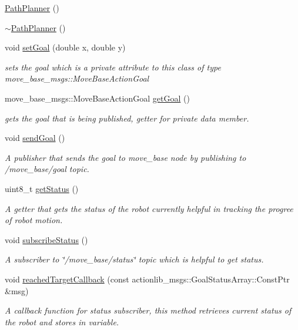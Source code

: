 \begin{DoxyCompactItemize}
\item 
\hyperlink{classPathPlanner_a376f30d795cfe0a40f8923f49336f7da}{Path\+Planner} ()
\item 
\hyperlink{classPathPlanner_a61bd61f848e519df56b75eddd3732ab8}{$\sim$\+Path\+Planner} ()
\item 
void \hyperlink{classPathPlanner_a3143ffa68678f4f30917565c339802dc}{set\+Goal} (double x, double y)
\begin{DoxyCompactList}\small\item\em sets the goal which is a private attribute to this class of type move\+\_\+base\+\_\+msgs\+::\+Move\+Base\+Action\+Goal \end{DoxyCompactList}\item 
move\+\_\+base\+\_\+msgs\+::\+Move\+Base\+Action\+Goal \hyperlink{classPathPlanner_a5828b4927eb0a4c4ab64d134ae6fbf3a}{get\+Goal} ()
\begin{DoxyCompactList}\small\item\em gets the goal that is being published, getter for private data member. \end{DoxyCompactList}\item 
void \hyperlink{classPathPlanner_a32ee3e597aace449eb1c2e2a7ff44439}{send\+Goal} ()
\begin{DoxyCompactList}\small\item\em A publisher that sends the goal to move\+\_\+base node by publishing to /move\+\_\+base/goal topic. \end{DoxyCompactList}\item 
uint8\+\_\+t \hyperlink{classPathPlanner_af2e19a41d18a7071f64c2973f1758c97}{get\+Status} ()
\begin{DoxyCompactList}\small\item\em A getter that gets the status of the robot currently helpful in tracking the progree of robot motion. \end{DoxyCompactList}\item 
void \hyperlink{classPathPlanner_a75b2efc17fc0d73a74de77bece725b3e}{subscribe\+Status} ()
\begin{DoxyCompactList}\small\item\em A subscriber to \char`\"{}/move\+\_\+base/status\char`\"{} topic which is helpful to get status. \end{DoxyCompactList}\item 
void \hyperlink{classPathPlanner_afa6a07572c40c98be76b19f592e8267d}{reached\+Target\+Callback} (const actionlib\+\_\+msgs\+::\+Goal\+Status\+Array\+::\+Const\+Ptr \&msg)
\begin{DoxyCompactList}\small\item\em A callback function for status subscriber, this method retrieves current status of the robot and stores in variable. \end{DoxyCompactList}\end{DoxyCompactItemize}


